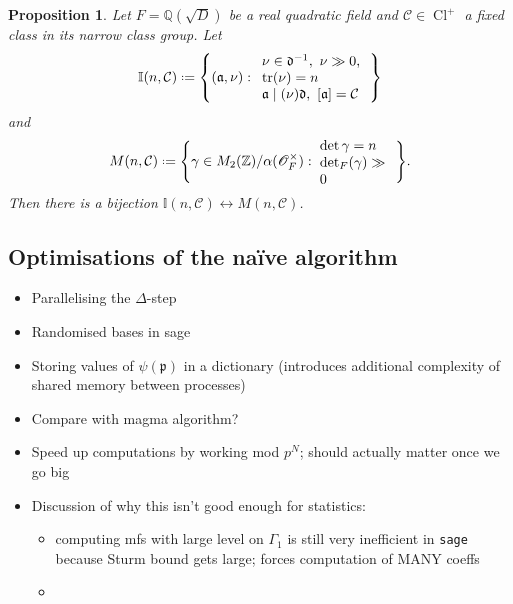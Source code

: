 \documentclass[11pt,a4paper]{article}
\let\mbb\mathbb
\let\mc\mathcal
\let\mf\mathfrak
\newcommand{\Z}{\mathbb{Z}}
\newcommand{\Q}{\mathbb{Q}}
\renewcommand{\O}{\mathscr{O}}
\newcommand*{\defeq}{\mathrel{\vcenter{\baselineskip0.5ex \lineskiplimit0pt
      \hbox{\scriptsize.}\hbox{\scriptsize.}}}%
  =}
\DeclareMathOperator{\Cl}{Cl}
\theoremstyle{plain}
\newtheorem{prop}[thm]{Proposition}
\theoremstyle{definition}
\theoremstyle{remark}
\numberwithin{equation}{section}
\begin{document}
\begin{prop}
  Let $F = \Q(\sqrt{D})$ be a real quadratic field and $\mc C \in
  \Cl^{+}$ a fixed class in its narrow class group. Let
  \begin{equation}
    \label{eq:9}
  \mbb I(n,\mc C) \defeq \qty{(\mf a, \nu) :\hspace{5pt} \parbox[c]{2.7cm}{\raggedright $ \nu \in
        \mf d^{-1},\ \nu \gg 0$,\\ $\tr(\nu)= n$ \\ $\mf a \mid (\nu)\mf
        d,\ [\mf a] = \mc C $ }}
  \end{equation}
and 
  \begin{equation}
    \label{eq:8}
    M(n,\mc C) \defeq \qty{\gamma \in M_{2}(\Z)/\alpha(\O_{F}^{\times})
      :\hspace{3pt} \parbox[l]{1.9cm}{\raggedright $ \det \gamma = n$ \\
        $\det_{F}(\gamma) \gg 0$ }}.
  \end{equation}
  Then there is a bijection $\mbb I(n,\mc C) \leftrightarrow M(n,\mc C)$. 
\end{prop}

\subsection{Optimisations of the naïve algorithm}
\label{sec:optim-naive-algor}
\begin{itemize}
\item Parallelising the $\Delta$-step
\item Randomised bases in sage
\item Storing values of $\psi(\mf p)$ in a dictionary (introduces
  additional complexity of shared memory between processes)
\item Compare with magma algorithm?
\item Speed up computations by working mod $p^{N}$; should actually
  matter once we go big
\item Discussion of why this isn't good enough for statistics:
  \begin{itemize}
  \item computing mfs with large level on $\Gamma_{1}$ is still very
    inefficient in \texttt{sage} because Sturm bound gets large;
    forces computation of MANY coeffs
  \item 
    
  \end{itemize}

\end{itemize}
\end{document}
